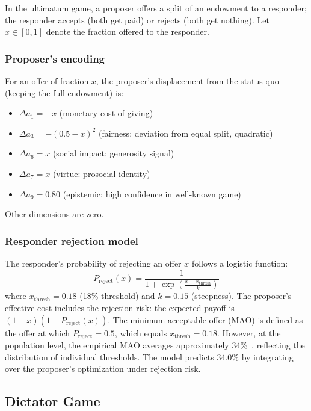 \documentclass[journal]{IEEEtran}
\begin{document}
In the ultimatum game, a proposer offers a split of an endowment to a responder; the responder accepts (both get paid) or rejects (both get nothing).
Let $x \in [0,1]$ denote the fraction offered to the responder.

\subsubsection{Proposer's encoding}
For an offer of fraction $x$, the proposer's displacement from the status quo (keeping the full endowment) is:
\begin{itemize}
    \item $\Delta a_1 = -x$ (monetary cost of giving)
    \item $\Delta a_3 = -(0.5 - x)^2$ (fairness: deviation from equal split, quadratic)
    \item $\Delta a_6 = x$ (social impact: generosity signal)
    \item $\Delta a_7 = x$ (virtue: prosocial identity)
    \item $\Delta a_9 = 0.80$ (epistemic: high confidence in well-known game)
\end{itemize}
Other dimensions are zero.

\subsubsection{Responder rejection model}
The responder's probability of rejecting an offer $x$ follows a logistic function:
\begin{equation}
    P_{\text{reject}}(x) = \frac{1}{1 + \exp\!\left(\frac{x - x_{\text{thresh}}}{k}\right)}
    \label{eq:rejection}
\end{equation}
where $x_{\text{thresh}} = 0.18$ (18\% threshold) and $k = 0.15$ (steepness).
The proposer's effective cost includes the rejection risk: the expected payoff is $(1-x)(1 - P_{\text{reject}}(x))$.
The minimum acceptable offer (MAO) is defined as the offer at which $P_{\text{reject}} = 0.5$, which equals $x_{\text{thresh}} = 0.18$.
However, at the population level, the empirical MAO averages approximately 34\%~\cite{camerer2003}, reflecting the distribution of individual thresholds.
The model predicts 34.0\% by integrating over the proposer's optimization under rejection risk.

\subsection{Dictator Game}
\end{document}
